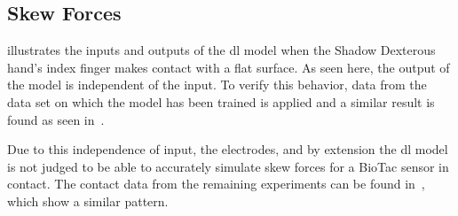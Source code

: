 \subsection{Skew Forces} \label{sec:1-tactile-perception-results-skew-forces}

 illustrates the inputs and outputs of the \gls{dl} model when the Shadow Dexterous hand's index finger makes contact with a flat surface. As seen here, the output of the model is independent of the input. To verify this behavior, data from the data set on which the model has been trained is applied and a similar result is found as seen in~. \medskip

Due to this independence of input, the electrodes, and by extension the \gls{dl} model is not judged to be able to accurately simulate skew forces for a BioTac sensor in contact. The contact data from the remaining experiments can be found in~, which show a similar pattern.

